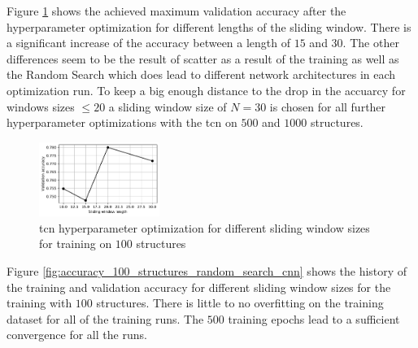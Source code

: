 \documentclass[conference]{IEEEtran}
\begin{document}
Figure \ref{fig:influence_sequence_length_tcn} shows the achieved maximum validation accuracy after the hyperparameter optimization for different lengths of the sliding window. There is a significant increase of the accuracy between a length of $ 15 $ and $ 30 $. The other differences seem to be the result of scatter as a result of the training as well as the Random Search which does lead to different network architectures in each optimization run. To keep a big enough distance to the drop in the accuarcy for windows sizes $ \leq 20 $ a sliding window size of $ N = 30 $ is chosen for all further hyperparameter optimizations with the \gls{tcn} on $ 500 $ and $ 1000 $ structures.

\begin{figure}[htp]
	\centering
	\includegraphics[width=0.35\textwidth]{python/influence_sequence_length_tcn.pdf}
	\caption{\gls{tcn} hyperparameter optimization for different sliding window sizes for training on $ 100 $ structures}
	\label{fig:influence_sequence_length_tcn}
\end{figure}

Figure \ref{fig:accuracy_100_structures_random_search_cnn} shows the history of the training and validation accuracy for different sliding window sizes for the training with $ 100 $ structures. There is little to no overfitting on the training dataset for all of the training runs. The $ 500 $ training epochs lead to a sufficient convergence for all the runs.
\end{document}
